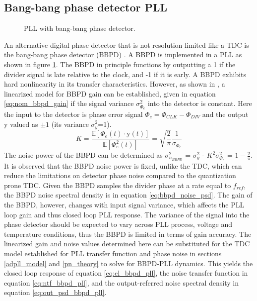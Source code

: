 \subsection{Bang-bang phase detector PLL}\label{bbpd_theory}
\vspace{-1em}
\begin{figure}[htb!]
	\center
	\caption{PLL with bang-bang phase detector.}
	\label{fig:bbpll}
\end{figure}
An alternative digital phase detector that is not resolution limited like a TDC is the bang-bang phase detector (BBPD) \cite{zanuso_2009}. A BBPD is implemented in a PLL as shown in figure \ref{fig:bbpll}. The BBPD in principle functions by outputting a 1 if the divider signal is late relative to the clock, and -1 if it is early. A BBPD exhibits hard nonlinearity in its transfer characteristics. However, as shown in \cite{xu_abidi_2017}, a linearized model for BBPD gain can be established, given in equation \ref{eq:nom_bbpd_gain} if the signal variance $\sigma_{\Phi_e}^2$ into the detector is constant. Here the input to the detector is phase error signal $\Phi_e=\Phi_{CLK}-\Phi_{DIV}$ and the output $\mathrm{y}$ valued as $\pm 1$ (its variance $\sigma_y^2$=1).
\begin{equation}\label{eq:nom_bbpd_gain}
	K = \frac{\mathbb{E}[\Phi_e(t)\cdot\mathrm{y}(t)]}{\mathbb{E}[\Phi_e^2(t)]} = \sqrt{\frac{2}{\pi}}\frac{1}{\sigma_{\Phi_e}}
\end{equation}
The noise power of the BBPD can be determined as $\sigma_{n_{BBPD}}^2$ = $\sigma_y^2$ - $K^2\sigma_{\Phi_e}^2$ = $1-\frac{2}{\pi}$. It is observed that the BBPD noise power is fixed, unlike the TDC, which can reduce the limitations on detector phase noise compared to the quantization prone TDC. Given the BBPD samples the divider phase at a rate equal to $f_{ref}$, the BBPD noise spectral density is in equation \ref{eq:bbpd_noise_psd}. The gain of the BBPD, however, changes with input signal variance, which affects the PLL loop gain and thus closed loop PLL response. The variance of the signal into the phase detector should be expected to vary across PLL process, voltage and temperature conditions, thus the BBPD is limited in terms of gain accuracy. The linearized gain and noise values determined here can be substituted for the TDC model established for PLL transfer function and phase noise in sections \ref{adpll_model} and \ref{pn_theory} to solve for BBPD-PLL dynamics. This yields the closed loop response of equation \ref{eq:cl_bbpd_pll}, the noise transfer function in equation \ref{eq:ntf_bbpd_pll}, and the output-referred noise spectral density in equation \ref{eq:out_psd_bbpd_pll}.
